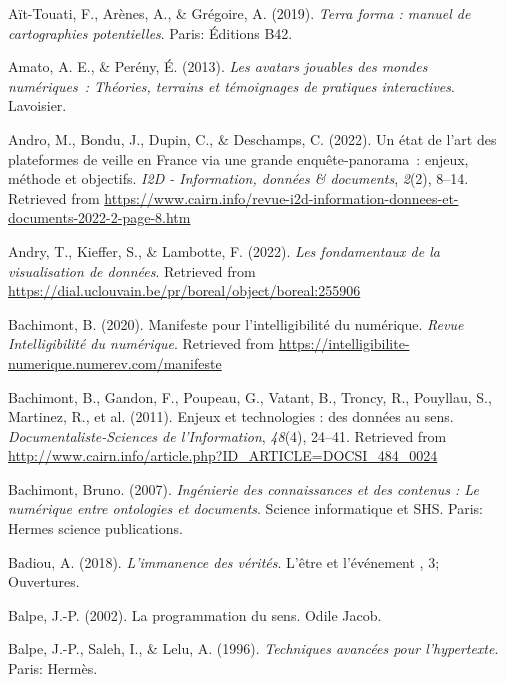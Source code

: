 \documentclass[
  a4paper,
  DIV=11,
  numbers=noendperiod]{scrreprt}
\newlength{\cslhangindent}
\newenvironment{CSLReferences}[2] %
 {\begin{list}{}{%
  \setlength{\itemindent}{0pt}
  \setlength{\leftmargin}{0pt}
  \setlength{\parsep}{0pt}
  \ifodd #1
   \setlength{\leftmargin}{\cslhangindent}
   \setlength{\itemindent}{-1\cslhangindent}
  \fi
  \setlength{\itemsep}{#2\baselineskip}}}
 {\end{list}}
\begin{document}
\label{refs}
\begin{CSLReferences}{1}{0}
Aït-Touati, F., Arènes, A., \& Grégoire, A. (2019). \emph{Terra forma :
manuel de cartographies potentielles}. Paris: Éditions B42.

Amato, A. E., \& Perény, É. (2013). \emph{Les avatars jouables des
mondes numériques~: Théories, terrains et témoignages de pratiques
interactives}. Lavoisier.

Andro, M., Bondu, J., Dupin, C., \& Deschamps, C. (2022). Un état de
l{'}art des plateformes de veille en France via une grande
enquête-panorama~: enjeux, méthode et objectifs. \emph{I2D -
Information, données \& documents}, \emph{2}(2), 8--14. Retrieved from
\url{https://www.cairn.info/revue-i2d-information-donnees-et-documents-2022-2-page-8.htm}

Andry, T., Kieffer, S., \& Lambotte, F. (2022). \emph{Les fondamentaux
de la visualisation de données}. Retrieved from
\url{https://dial.uclouvain.be/pr/boreal/object/boreal:255906}

Bachimont, B. (2020). Manifeste pour l'intelligibilité du numérique.
\emph{Revue Intelligibilité du numérique}. Retrieved from
\url{https://intelligibilite-numerique.numerev.com/manifeste}

Bachimont, B., Gandon, F., Poupeau, G., Vatant, B., Troncy, R.,
Pouyllau, S., Martinez, R., et al. (2011). Enjeux et technologies : des
données au sens. \emph{Documentaliste-Sciences de l'Information},
\emph{48}(4), 24--41. Retrieved from
\url{http://www.cairn.info/article.php?ID_ARTICLE=DOCSI_484_0024}

Bachimont, Bruno. (2007). \emph{Ingénierie des connaissances et des
contenus : Le numérique entre ontologies et documents}. Science
informatique et SHS. Paris: Hermes science publications.

Badiou, A. (2018). \emph{L'immanence des vérités}. L'être et l'événement
, 3; Ouvertures.

Balpe, J.-P. (2002). La programmation du sens. Odile Jacob.

Balpe, J.-P., Saleh, I., \& Lelu, A. (1996). \emph{Techniques avancées
pour l'hypertexte}. Paris: Hermès.


\end{CSLReferences}
\end{document}
